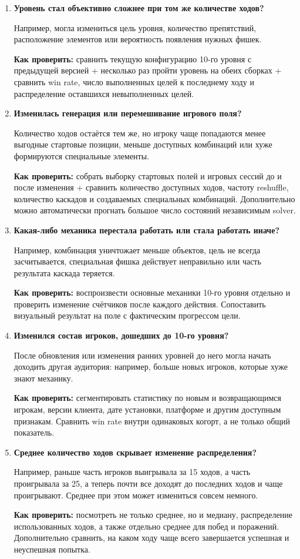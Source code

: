 \documentclass{ZGJournalArticle_2026}
\begin{document}
\begin{enumerate}
\def\labelenumi{\arabic{enumi}.}
\item
  \textbf{Уровень стал объективно сложнее при том же количестве ходов?}

  Например, могла измениться цель уровня, количество препятствий,
  расположение элементов или вероятность появления нужных фишек.

  \textbf{Как проверить:} сравнить текущую конфигурацию 10-го уровня с
  предыдущей версией + несколько раз пройти уровень на обеих сборках +
  сравнить win rate, число выполненных целей к последнему ходу и
  распределение оставшихся невыполненных целей.
\item
  \textbf{Изменилась генерация или перемешивание игрового поля?}

  Количество ходов остаётся тем же, но игроку чаще попадаются менее
  выгодные стартовые позиции, меньше доступных комбинаций или хуже
  формируются специальные элементы.

  \textbf{Как проверить:} собрать выборку стартовых полей и игровых
  сессий до и после изменения + сравнить количество доступных ходов,
  частоту reshuffle, количество каскадов и создаваемых специальных
  комбинаций. Дополнительно можно автоматически прогнать большое число
  состояний независимым solver.
\item
  \textbf{Какая-либо механика перестала работать или стала работать
  иначе?}

  Например, комбинация уничтожает меньше объектов, цель не всегда
  засчитывается, специальная фишка действует неправильно или часть
  результата каскада теряется.

  \textbf{Как проверить:} воспроизвести основные механики 10-го уровня
  отдельно и проверить изменение счётчиков после каждого действия.
  Сопоставить визуальный результат на поле с фактическим прогрессом
  цели.
\item
  \textbf{Изменился состав игроков, дошедших до 10-го уровня?}

  После обновления или изменения ранних уровней до него могла начать
  доходить другая аудитория: например, больше новых игроков, которые
  хуже знают механику.

  \textbf{Как проверить:} сегментировать статистику по новым и
  возвращающимся игрокам, версии клиента, дате установки, платформе и
  другим доступным признакам. Сравнить win rate внутри одинаковых
  когорт, а не только общий показатель.
\item
  \textbf{Среднее количество ходов скрывает изменение распределения?}

  Например, раньше часть игроков выигрывала за 15 ходов, а часть
  проигрывала за 25, а теперь почти все доходят до последних ходов и
  чаще проигрывают. Среднее при этом может измениться совсем немного.

  \textbf{Как проверить:} посмотреть не только среднее, но и медиану,
  распределение использованных ходов, а также отдельно среднее для побед
  и поражений. Дополнительно сравнить, на каком ходу чаще всего
  завершается успешная и неуспешная попытка.
\end{enumerate}
\end{document}

